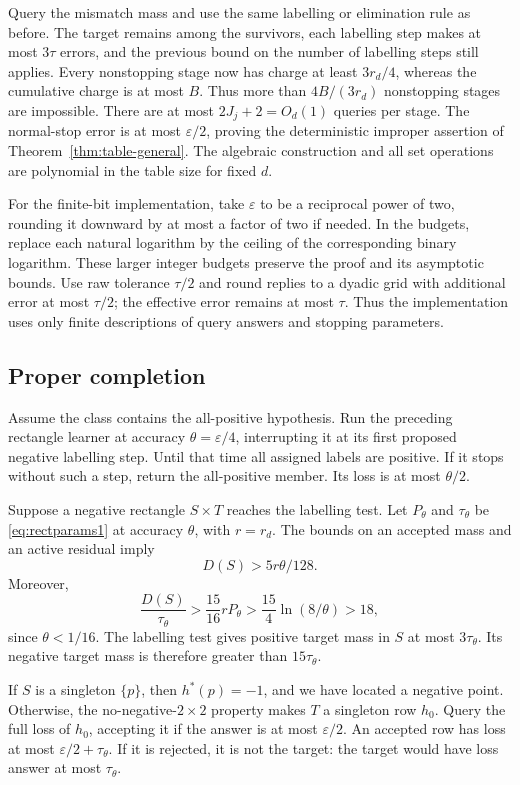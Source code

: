 \documentclass[11pt,letterpaper,pmlr,twoside]{jmlr}
\newcommand{\eps}{\varepsilon}
\begin{document}
Query the mismatch mass and use the same labelling or elimination rule as before. The target remains among the survivors, each labelling step makes at most $3\tau$ errors, and the previous bound on the number of labelling steps still applies. Every nonstopping stage now has charge at least $3r_d/4$, whereas the cumulative charge is at most $B$. Thus more than $4B/(3r_d)$ nonstopping stages are impossible. There are at most $2J_j+2=O_d(1)$ queries per stage. The normal-stop error is at most $\eps/2$, proving the deterministic improper assertion of Theorem~\ref{thm:table-general}. The algebraic construction and all set operations are polynomial in the table size for fixed $d$.

For the finite-bit implementation, take $\eps$ to be a reciprocal power of two, rounding it downward by at most a factor of two if needed. In the budgets, replace each natural logarithm by the ceiling of the corresponding binary logarithm. These larger integer budgets preserve the proof and its asymptotic bounds. Use raw tolerance $\tau/2$ and round replies to a dyadic grid with additional error at most $\tau/2$; the effective error remains at most $\tau$. Thus the implementation uses only finite descriptions of query answers and stopping parameters.

\subsection{Proper completion}
Assume the class contains the all-positive hypothesis. Run the preceding rectangle learner at accuracy $\theta=\eps/4$, interrupting it at its first proposed negative labelling step. Until that time all assigned labels are positive. If it stops without such a step, return the all-positive member. Its loss is at most $\theta/2$.

Suppose a negative rectangle $S\times T$ reaches the labelling test. Let $P_\theta$ and $\tau_\theta$ be \eqref{eq:rectparams1} at accuracy $\theta$, with $r=r_d$. The bounds on an accepted mass and an active residual imply
\[
 D(S)>5r\theta/128.
\]
Moreover,
\[
 \frac{D(S)}{\tau_\theta}
 >\frac{15}{16}rP_\theta
 >\frac{15}{4}\ln(8/\theta)>18,
\]
since $\theta<1/16$. The labelling test gives positive target mass in $S$ at most $3\tau_\theta$. Its negative target mass is therefore greater than $15\tau_\theta$.

If $S$ is a singleton $\{p\}$, then $h^*(p)=-1$, and we have located a negative point. Otherwise, the no-negative-$2\times2$ property makes $T$ a singleton row $h_0$. Query the full loss of $h_0$, accepting it if the answer is at most $\eps/2$. An accepted row has loss at most $\eps/2+\tau_\theta$. If it is rejected, it is not the target: the target would have loss answer at most $\tau_\theta$.
\end{document}
